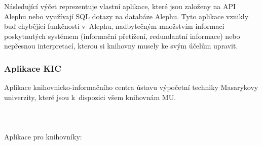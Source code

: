 \documentclass[
	11pt, oneside, printed, final, palatino, monochrome
	microtype,
	table,   %
	lof,     %
	lot     %
]{fithesis3}
\begin{document}
{Následující výčet reprezentuje vlastní aplikace, které jsou založeny na API Alephu nebo využívají SQL dotazy na databáze Alephu. Tyto aplikace vznikly buď chybějící funkčností v~Alephu, nadbytečným množstvím informací poskytnutých systémem (informační přetížení, redundantní informace) nebo nepřesnou interpretací, kterou si knihovny musely ke svým účelům upravit.

\subsubsection{Aplikace KIC}
Aplikace knihovnicko-informačního centra ústavu výpočetní techniky Masarykovy univerzity, které jsou k~dispozici všem knihovnám MU.
~\\~\\~\\~\\%
Aplikace pro knihovníky:

}
\end{document}
